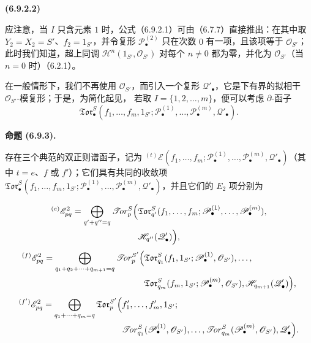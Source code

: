 \documentclass[UTF8,fontset=none,11pt,oneside,openany]{ctexbook}
\newenvironment{env}[1][]{%
  \par\medskip\noindent\textbf{(#1)}\ %
}{\par}
\newenvironment{proposition}[1][]{%
  \par\medskip\noindent\textbf{命题 (#1).}\ %
}{\par}
\newcommand{\oldpage}[2][]{%
  \hypertarget{ega-source-page-#1-#2}{}%
  \marginnote{\scriptsize\textbf{#1}~|~#2}\ignorespaces}
\begin{document}
\begin{env}[6.9.2.2]
应注意，当 $I$ 只含元素 $1$ 时，公式（6.9.2.1）可由（6.7.7）直接推出：在其中取
$Y_2=X_2=S'$、$f_2=1_{S'}$，并令复形 $\mathscr P_\bullet^{(2)}$
只在次数 $0$ 有一项，且该项等于 $\mathscr O_{S'}$；此时我们知道，超上同调
$\mathscr H^n(1_{S'},\mathscr O_{S'})$ 对每个 $n\ne0$ 都为零，并化为
$\mathscr O_{S'}$（当 $n=0$ 时）（6.2.1）。
\end{env}

在一般情形下，我们不再使用 $\mathscr O_{S'}$，而引入一个复形
$\mathscr Q'_\bullet$，它是下有界的拟相干 $\mathscr O_{S'}$-模复形；于是，为简化起见，
若取 $I=\{1,2,\ldots,m\}$，便可以考虑 $\partial$-函子
\[
  \mathfrak{Tor}_\bullet^S
  (f_1,\ldots,f_m,1_{S'};
   \mathscr P_\bullet^{(1)},\ldots,\mathscr P_\bullet^{(m)},
   \mathscr Q'_\bullet).
\]

\begin{proposition}[6.9.3]
存在三个典范的双正则谱函子，记为
${}^{(t)}\mathscr E(f_1,\ldots,f_m;
\mathscr P_\bullet^{(1)},\ldots,\mathscr P_\bullet^{(m)},
\mathscr Q'_\bullet)$（其中 $t=e$、$f$ 或 $f'$）；它们具有共同的收敛项
$\mathfrak{Tor}_\bullet^S(f_1,\ldots,f_m,1_{S'};
\mathscr P_\bullet^{(1)},\ldots,\mathscr P_\bullet^{(m)},
\mathscr Q'_\bullet)$，并且它们的 $E_2$ 项分别为

\oldpage[III]{167}
\[
\begin{split}
  {}^{(e)}\mathscr E_{pq}^2
  =\bigoplus_{q'+q''=q}
  \mathscr{T}\!or_p^S\Bigl(
  &\mathfrak{Tor}_{q'}^S
  (f_1,\ldots,f_m;
   \mathscr P_\bullet^{(1)},\ldots,\mathscr P_\bullet^{(m)}),\\
  &\mathscr H_{q''}(\mathscr Q'_\bullet)
  \Bigr),
\end{split}
\]
\[
\begin{split}
  {}^{(f)}\mathscr E_{pq}^2
  =\bigoplus_{q_1+q_2+\cdots+q_{m+1}=q}
  \mathscr{T}\!or_p^{S'}\Bigl(
  &\mathfrak{Tor}_{q_1}^S
  (f_1,1_{S'};\mathscr P_\bullet^{(1)},\mathscr O_{S'}),\ldots,\\
  &\mathfrak{Tor}_{q_m}^S
  (f_m,1_{S'};\mathscr P_\bullet^{(m)},\mathscr O_{S'}),
  \mathscr H_{q_{m+1}}(\mathscr Q'_\bullet)
  \Bigr),
\end{split}
\]
\[
\begin{split}
  {}^{(f')}\mathscr E_{pq}^2
  =\bigoplus_{q_1+\cdots+q_m=q}
  \mathfrak{Tor}_p^{S'}\Bigl(
  &f'_1,\ldots,f'_m,1_{S'};\\
  &\mathscr{T}\!or_{q_1}^S
  (\mathscr P_\bullet^{(1)},\mathscr O_{S'}),\ldots,
  \mathscr{T}\!or_{q_m}^S
  (\mathscr P_\bullet^{(m)},\mathscr O_{S'}),
  \mathscr Q'_\bullet
  \Bigr).
\end{split}
\]
\end{proposition}
\end{document}
